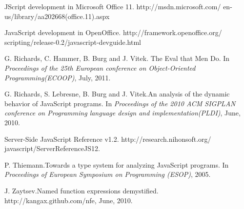\documentclass[10pt, preprint]{sigplanconf}
\begin{document}
\begin{thebibliography}{}
JScript development in Microsoft Office 11.
\newblock http://msdn.microsoft.com/ en-us/library/aa202668(office.11).aspx

JavaScript development in OpenOffice.
\newblock http://framework.openoffice.org/ scripting/release-0.2/javascript-devguide.html

G. Richards, C. Hammer, B. Burg and J. Vitek. \newblock The Eval that Men Do.
\newblock In \emph{Proceedings of the 25th European conference on Object-Oriented Programming(ECOOP)},
July, 2011.

G. Richards, S. Lebresne, B. Burg and J. Vitek.\newblock An analysis of the dynamic behavior of JavaScript programs.
\newblock In \emph{Proceedings of the 2010 ACM SIGPLAN conference on Programming language design and implementation(PLDI)},
June, 2010.

Server-Side JavaScript Reference v1.2.
\newblock http://research.nihonsoft.org/ javascript/ServerReferenceJS12.

P. Thiemann.\newblock Towards a type system for analyzing JavaScript programs.
\newblock In \emph{Proceedings of European Symposium on Programming (ESOP)},
2005.

J. Zaytsev.\newblock Named function expressions demystified.
\newblock http://kangax.github.com/nfe,
June, 2010.


\end{thebibliography}
\end{document}
